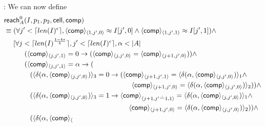 \documentclass{LMCS}
\newcommand{\abs}[1]{\left\vert#1\right\vert}
\newcommand{\dotminus}{\mathbin{\setbox0\hbox{$-$}\setbox2\hbox to\wd0{\hss$^{\mkern1mu\cdot}$\hss}\wd2=0pt\box2\box0}}
\newenvironment{proof}{\QuadSpace\par\noindent{\bf
Proof}:}{\EndProof\HalfSpace} \fi
\newcommand{\QuadSpace}{}\newcommand{\HalfSpace}{}\newcommand{\FullSpace}{}\newcommand{\EndProof}{ \hfill \vrule width 1ex height 1ex depth 0pt }
\newenvironment{proof}{

\smallskip
\noindent\emph{Proof.}}{\hfill\(\Box\)
\bigskip
} \fi
\begin{document}
\begin{proof}
  We can now define
\begin{equation*}
    \begin{split}
      &\mathsf{reach}^0_A(I,p_1,p_2,\mathsf{cell},\mathsf{comp})\\
&\equiv {\large (}\forall j'<\lceil len(I)^{\epsilon}\rceil,
      \langle\mathsf{comp}\rangle_{\langle 1,j',0\rangle} \approx  I[j',0]\land
\langle\mathsf{comp}\rangle_{\langle 1,j',1\rangle} \approx
      I[j',1]{\large )}\land\\ 
&\phantom{{}\equiv{}}
      [\forall j<\lceil len(I)^{\frac{1-k\epsilon}{k}}\rceil,j'<\lceil
        len(I)^{\epsilon}\rceil,\alpha<\abs{A}\\
&\phantom{{}\equiv{}}\hspace{16pt}
      (\langle\mathsf{comp}\rangle_{\langle j,j',1\rangle} = 0\rightarrow (\langle\mathsf{comp}
      \rangle_{\langle j,j',0\rangle} = \langle\mathsf{comp}\rangle_{\langle
      j+1,j',0\rangle}))\land\\ 
&\phantom{{}\equiv{}}\hspace{16pt}
      (\langle\mathsf{comp}\rangle_{\langle j,j',1\rangle} =
      \alpha\rightarrow(\\
&\phantom{{}\equiv{}}\hspace{24pt}
      (\langle \delta(\alpha,\langle\mathsf{comp}\rangle_{\langle
        j,j',0\rangle})\rangle_3=0\rightarrow (\langle\mathsf{comp}\rangle_{\langle j+1,j',1\rangle}=\langle \delta(\alpha,\langle\mathsf{comp}\rangle_{\langle
      j,j',0\rangle})\rangle_1 \land\\
&\hspace{183 pt}
      \langle\mathsf{comp}\rangle_{\langle j+1,j',0\rangle}=\langle \delta(\alpha,\langle\mathsf{comp}\rangle_{\langle
      j,j',0\rangle})\rangle_2))\land\\
&\phantom{{}\equiv{}}\hspace{24pt}
      (\langle \delta(\alpha,\langle\mathsf{comp}\rangle_{\langle
        j,j',0\rangle})\rangle_3=1\rightarrow \langle\mathsf{comp}\rangle_{\langle j+1,j'\dotminus 1,1\rangle}=\langle \delta(\alpha,\langle\mathsf{comp}\rangle_{\langle
      j,j',0\rangle})\rangle_1 \land\\
&\hspace{179 pt}
      \langle\mathsf{comp}\rangle_{\langle j+1,j',0\rangle}=\langle \delta(\alpha,\langle\mathsf{comp}\rangle_{\langle
      j,j',0\rangle})\rangle_2))\land\\
&\phantom{{}\equiv{}}\hspace{24pt}
      (\langle \delta(\alpha,\langle\mathsf{comp}\rangle_{\langle
}
\end{split}
\end{equation*}
\end{proof}
\end{document}
